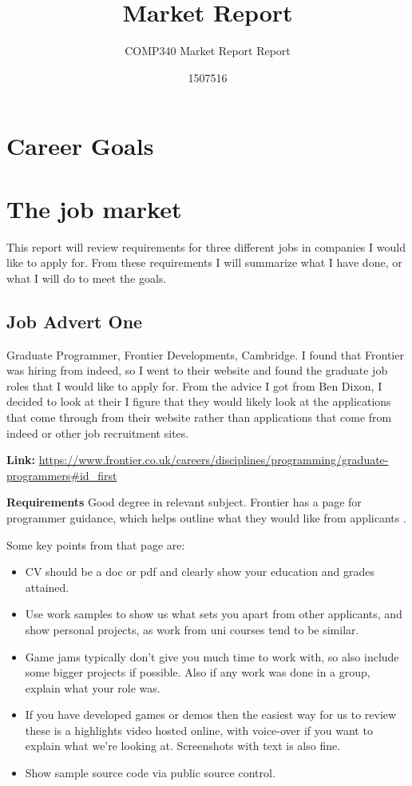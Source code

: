 \documentclass{scrartcl}
\title{Market Report}
\subtitle{COMP340 Market Report Report}
\author{1507516}
\begin{document}
\maketitle


\section{Career Goals}

\section{The job market}
This report will review requirements for three different jobs in companies I would like to apply for. From these requirements I will summarize what I have done, or what I will do to meet the goals. 


\subsection{Job Advert One}
Graduate Programmer, Frontier Developments, Cambridge. 
I found that Frontier was hiring from indeed, so I went to their website and found the graduate job roles that I would like to apply for.
From the advice I got from Ben Dixon, I decided to look at their
I figure that they would likely look at the applications that come through from their website rather than applications that come from indeed or other job recruitment sites.

\textbf{Link: }
\url{https://www.frontier.co.uk/careers/disciplines/programming/graduate-programmers#id_first} \cite{JobOne}

\textbf{Requirements}
Good degree in relevant subject.
 Frontier has a page for programmer guidance, which helps outline what they would like from applicants \cite{FrontierAdvice}.

Some key points from that page are:
\begin{itemize}
	\item CV should be a doc or pdf and clearly show your education and grades attained.
	\item Use work samples to show us what sets you apart from other applicants, and show personal projects, as work from uni courses tend to be similar.
	\item Game jams typically don't give you much time to work with, so also include some bigger projects if possible. Also if any work was done in a group, explain what your role was.
	\item If you have developed games or demos then the easiest way for us to review these is a highlights video hosted online, with voice-over if you want to explain what we're looking at. Screenshots with text is also fine.
	\item Show sample source code via public source control.
\end{itemize}
\end{document}

